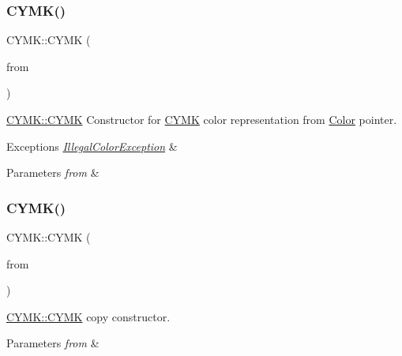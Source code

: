 \subsubsection{\texorpdfstring{C\+Y\+M\+K()}{CYMK()}\hspace{0.1cm}{\footnotesize\ttfamily [2/3]}}
{\footnotesize\ttfamily C\+Y\+M\+K\+::\+C\+Y\+MK (\begin{DoxyParamCaption}\item[{const \hyperlink{class_color}{Color} $\ast$}]{from }\end{DoxyParamCaption})}



\hyperlink{class_c_y_m_k_a1aa6a0953837818a2b298476cab9388d}{C\+Y\+M\+K\+::\+C\+Y\+MK} Constructor for \hyperlink{class_c_y_m_k}{C\+Y\+MK} color representation from \hyperlink{class_color}{Color} pointer. 


\begin{DoxyExceptions}{Exceptions}
{\em \hyperlink{class_illegal_color_exception}{Illegal\+Color\+Exception}} & \\
\hline
\end{DoxyExceptions}

\begin{DoxyParams}{Parameters}
{\em from} & \\
\hline
\end{DoxyParams}
\mbox{\label{class_c_y_m_k_a4bccfb3b46229aa82827bd6988efaa8c}} 
\subsubsection{\texorpdfstring{C\+Y\+M\+K()}{CYMK()}\hspace{0.1cm}{\footnotesize\ttfamily [3/3]}}
{\footnotesize\ttfamily C\+Y\+M\+K\+::\+C\+Y\+MK (\begin{DoxyParamCaption}\item[{const \hyperlink{class_c_y_m_k}{C\+Y\+MK} \&}]{from }\end{DoxyParamCaption})}



\hyperlink{class_c_y_m_k_a1aa6a0953837818a2b298476cab9388d}{C\+Y\+M\+K\+::\+C\+Y\+MK} copy constructor. 


\begin{DoxyParams}{Parameters}
{\em from} & \\
\hline
\end{DoxyParams}


